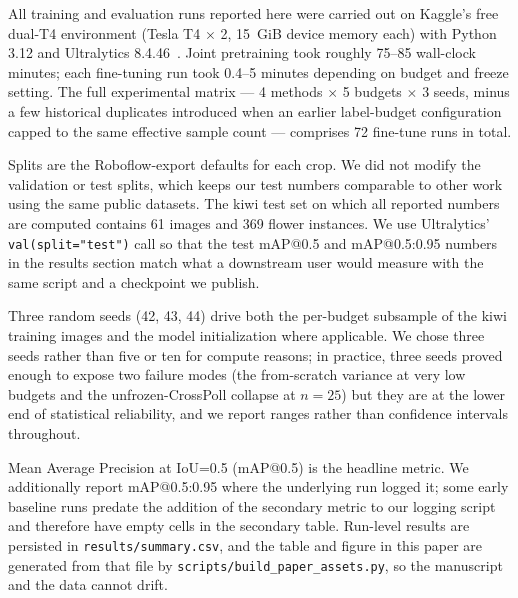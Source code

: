 All training and evaluation runs reported here were carried out on Kaggle's free dual-T4 environment (Tesla T4 $\times$ 2, 15~GiB device memory each) with Python 3.12 and Ultralytics 8.4.46~\cite{jocher2023ultralytics}. Joint pretraining took roughly 75--85 wall-clock minutes; each fine-tuning run took 0.4--5 minutes depending on budget and freeze setting. The full experimental matrix --- 4 methods $\times$ 5 budgets $\times$ 3 seeds, minus a few historical duplicates introduced when an earlier label-budget configuration capped to the same effective sample count --- comprises 72 fine-tune runs in total.

Splits are the Roboflow-export defaults for each crop. We did not modify the validation or test splits, which keeps our test numbers comparable to other work using the same public datasets. The kiwi test set on which all reported numbers are computed contains 61 images and 369 flower instances. We use Ultralytics' \texttt{val(split="test")} call so that the test mAP@0.5 and mAP@0.5{:}0.95 numbers in the results section match what a downstream user would measure with the same script and a checkpoint we publish.

Three random seeds (42, 43, 44) drive both the per-budget subsample of the kiwi training images and the model initialization where applicable. We chose three seeds rather than five or ten for compute reasons; in practice, three seeds proved enough to expose two failure modes (the from-scratch variance at very low budgets and the unfrozen-CrossPoll collapse at $n{=}25$) but they are at the lower end of statistical reliability, and we report ranges rather than confidence intervals throughout.

Mean Average Precision at IoU=0.5 (mAP@0.5) is the headline metric. We additionally report mAP@0.5{:}0.95 where the underlying run logged it; some early baseline runs predate the addition of the secondary metric to our logging script and therefore have empty cells in the secondary table. Run-level results are persisted in \texttt{results/summary.csv}, and the table and figure in this paper are generated from that file by \texttt{scripts/build\_paper\_assets.py}, so the manuscript and the data cannot drift.
